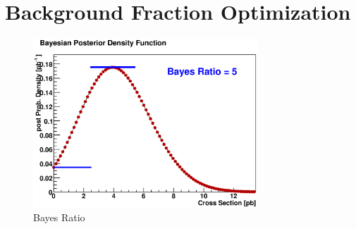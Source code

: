 \chapter{Background Fraction Optimization}
\label{optimization}




\begin{figure}[!h!tbp]
\begin{center}
\includegraphics[width=0.75\textwidth]{eps/Limits/BayesRatio.eps}
\end{center}
\vspace{-0.1in}
\caption{Bayes Ratio}
\label{BayesRatioAgain}
\end{figure}

